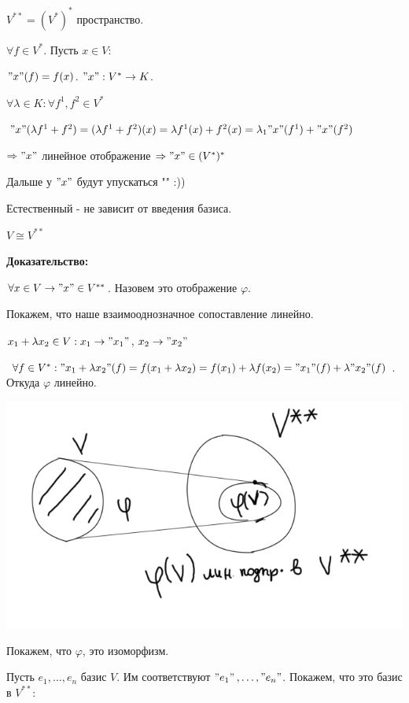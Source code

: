  $V^{**} = (V^*)^*$  пространство.

$\forall f \in V^*$. Пусть $x \in V$:

$"x"(f) = f(x)$. $"x": V^* \rightarrow K$.

$\forall \lambda \in K: \forall f^1,f^2 \in V^*$

$"x"(\lambda f^1+f^2) = (\lambda f^1 + f^2)(x) = \lambda f^1(x) + f^2(x) = \lambda_1 "x"(f^1) + "x"(f^2)$

$\Rightarrow "x"$ линейное отображение $\Rightarrow"x" \in (V^*)^*$

Дальше у $"x"$ будут упускаться "" :))


Естественный - не зависит от введения базиса.

$V \cong V^{**}$

\textbf{Доказательство:}

$\forall x \in V \rightarrow "x"\in V^{**}$. Назовем это отображение $\varphi$.

Покажем, что наше взаимооднозначное сопоставление линейно.

$x_1 + \lambda x_2 \in V: x_1 \rightarrow "x_1"$, $x_2 \rightarrow "x_2"$


$\forall f\in V^*: "x_1+\lambda x_2"(f) = f(x_1+\lambda x_2) = f(x_1) + \lambda f(x_2) = "x_1"(f) + \lambda"x_2"(f) $. Откуда $\varphi$ линейно.

\begin{center}
    \includegraphics[width =15cm]{assets/8_1-varphi-linear.png}
\end{center}

Покажем, что $\varphi$, это изоморфизм.

Пусть $e_1,\ldots, e_n$ базис $V$. Им соответствуют $ "e_1"$$,\ldots, "e_n"$. Покажем, что это базис в $V^{**}$:

